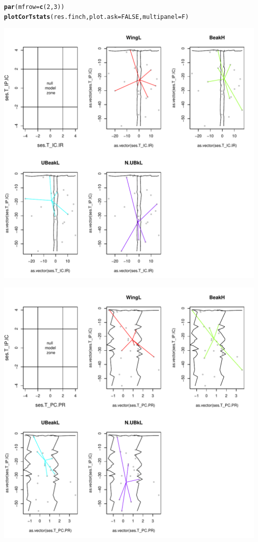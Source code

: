 \documentclass[12pt]{article}\usepackage[]{graphicx}\usepackage[]{color}
\makeatletter
\def\maxwidth{ %
  \ifdim\Gin@nat@width>\linewidth
    \linewidth
  \else
    \Gin@nat@width
  \fi
}
\newcommand{\hlnum}[1]{\textcolor[rgb]{0.686,0.059,0.569}{#1}}%
\newcommand{\hlstd}[1]{\textcolor[rgb]{0.345,0.345,0.345}{#1}}%
\newcommand{\hlkwc}[1]{\textcolor[rgb]{0.333,0.667,0.333}{#1}}%
\newcommand{\hlkwd}[1]{\textcolor[rgb]{0.737,0.353,0.396}{\textbf{#1}}}%
\newenvironment{kframe}{%
 \def\at@end@of@kframe{}%
 \ifinner\ifhmode%
  \def\at@end@of@kframe{\end{minipage}}%
  \begin{minipage}{\columnwidth}%
 \fi\fi%
 \def\FrameCommand##1{\hskip\@totalleftmargin \hskip-\fboxsep
 \colorbox{shadecolor}{##1}\hskip-\fboxsep
     \hskip-\linewidth \hskip-\@totalleftmargin \hskip\columnwidth}%
 \MakeFramed {\advance\hsize-\width
   \@totalleftmargin\z@ \linewidth\hsize
   \@setminipage}}%
 {\par\unskip\endMakeFramed%
 \at@end@of@kframe}
\newenvironment{knitrout}{}{} %
\makeatother
\begin{document}
\begin{knitrout}
\color{fgcolor}\begin{kframe}
\begin{alltt}
\hlkwd{par}\hlstd{(}\hlkwc{mfrow}\hlstd{=}\hlkwd{c}\hlstd{(}\hlnum{2}\hlstd{,}\hlnum{3}\hlstd{))}
\hlkwd{plotCorTstats}\hlstd{(res.finch,} \hlkwc{plot.ask}\hlstd{=}\hlnum{FALSE}\hlstd{,} \hlkwc{multipanel}\hlstd{=F)}
\end{alltt}
\end{kframe}
\includegraphics[width=\maxwidth]{figure/unnamed-chunk-331} 

\includegraphics[width=\maxwidth]{figure/unnamed-chunk-332} 


\end{knitrout}
\end{document}
